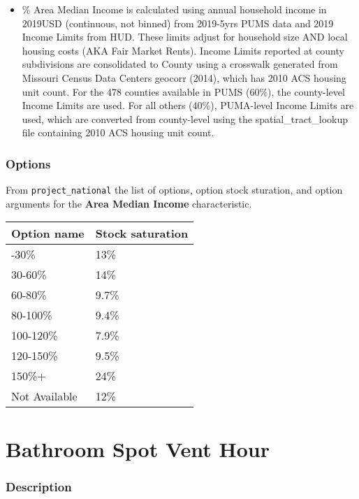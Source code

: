 \begin{itemize}
 
\item
  \% Area Median Income is calculated using annual household income in
  2019USD (continuous, not binned) from 2019-5yrs PUMS data and 2019
  Income Limits from HUD. These limits adjust for household size AND
  local housing costs (AKA Fair Market Rents). Income Limits reported at
  county subdivisions are consolidated to County using a crosswalk
  generated from Missouri Census Data Center\textquotesingle s geocorr
  (2014), which has 2010 ACS housing unit count. For the 478 counties
  available in PUMS (60\%), the county-level Income Limits are used. For
  all others (40\%), PUMA-level Income Limits are used, which are
  converted from county-level using the spatial\_tract\_lookup file
  containing 2010 ACS housing unit count.
\end{itemize}

\subsubsection{Options}\label{options-4}

From \texttt{project\_national} the list of options, option stock
sturation, and option arguments for the \textbf{Area Median Income}
characteristic.

\begin{longtable}[]{@{}ll@{}}
\toprule\noalign{}
Option name & Stock saturation \\
\midrule\noalign{}
\endhead
\bottomrule\noalign{}
\endlastfoot
0-30\% & 13\% \\
30-60\% & 14\% \\
60-80\% & 9.7\% \\
80-100\% & 9.4\% \\
100-120\% & 7.9\% \\
120-150\% & 9.5\% \\
150\%+ & 24\% \\
Not Available & 12\% \\
\end{longtable}

\section{Bathroom Spot Vent Hour}\label{bathroom_spot_vent_hour}

\subsubsection{Description}\label{description-5}


